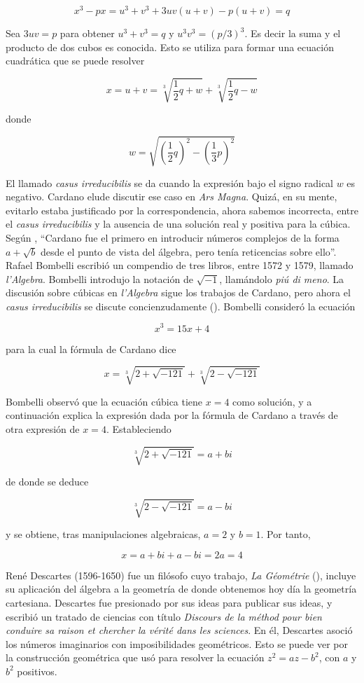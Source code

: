 \documentclass[../main.tex]{memoir}
\begin{document}
$$ x^3-px = u^3+v^3+3uv(u+v)-p(u+v) = q$$

Sea $3uv = p$ para obtener $u^3+v^3 = q$ y $u^3 v^3=(p/3)^3$. Es decir la suma y el producto de dos cubos es conocida. Esto se utiliza para formar una ecuación cuadrática que se puede resolver

$$ x = u+v = \sqrt[3]{\frac{1}{2}q+w} + \sqrt[3]{\frac{1}{2}q-w}$$

donde 

$$ w = \sqrt{(\frac{1}{2}q)^2-(\frac{1}{3}p)^2}$$

El llamado \textit{casus irreducibilis} se da cuando la expresión bajo el signo radical $w$ es negativo. Cardano elude discutir ese caso en \textit{Ars Magna}. Quizá, en su mente, evitarlo estaba justificado por la correspondencia, ahora sabemos incorrecta, entre el \textit{casus irreducibilis} y la ausencia de una solución real y positiva para la cúbica. \\

Según \cite{waerden1985}, ``Cardano fue el primero en introducir números complejos de la forma $a + \sqrt{b}$ desde el punto de vista del álgebra, pero tenía reticencias sobre ello''.\\

Rafael Bombelli escribió un compendio de tres libros, entre 1572 y 1579, llamado \textit{l'Algebra}. Bombelli introdujo la notación de $\sqrt{-1}$, llamándolo \textit{piú di meno}. La discusión sobre cúbicas en \textit{l'Algebra} sigue los trabajos de Cardano, pero ahora el \textit{casus irreducibilis} se discute concienzudamente (\cite{blank1999}). Bombelli consideró la ecuación

$$ x^3 = 15x+4$$

para la cual la fórmula de Cardano dice

$$ x = \sqrt[3]{2+\sqrt{-121}} + \sqrt[3]{2-\sqrt{-121}}$$

Bombelli observó que la ecuación cúbica tiene $x = 4$ como solución, y a continuación explica la expresión dada por la fórmula de Cardano a través de otra expresión de $x = 4$. Estableciendo

$$ \sqrt[3]{2+\sqrt{-121}} = a +bi$$

de donde se deduce

$$ \sqrt[3]{2-\sqrt{-121}} = a-bi$$

y se obtiene, tras manipulaciones algebraicas, $a=2$ y $b=1$. Por tanto,

$$x = a+bi +a -bi = 2a = 4$$

René Descartes (1596-1650) fue un filósofo cuyo trabajo, \textit{La Géométrie} (\cite{descartes1952}), incluye su aplicación del álgebra a la geometría de donde obtenemos hoy día la geometría cartesiana. Descartes fue presionado por sus ideas para publicar sus ideas, y escribió un tratado de ciencias con título \textit{Discours de la méthod pour bien conduire sa raison et chercher la vérité dans les sciences}. En él, Descartes asoció los números imaginarios con imposibilidades geométricos. Esto se puede ver por la construcción geométrica que usó para resolver la ecuación $z^2 =az-b^2$, con $a$ y $b^2$ positivos. \\
\end{document}
